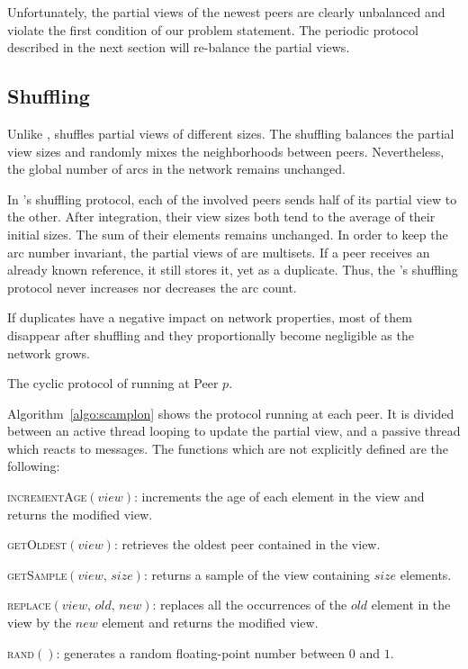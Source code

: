 Unfortunately, the partial views of the newest peers are clearly unbalanced and
violate the first condition of our problem statement. The periodic protocol
described in the next section will re-balance the partial views.

\subsection{Shuffling}
\label{subsec:cyclic}

Unlike \CYCLON, \SPRAY shuffles partial views of different sizes. The
shuffling balances the partial view sizes and randomly mixes the
neighborhoods between peers. Nevertheless, the global number of arcs
in the network remains unchanged.

In \SPRAY's shuffling protocol, each of the involved peers sends half of its
partial view to the other. After integration, their view sizes both tend to the
average of their initial sizes. The sum of their elements remains unchanged. In
order to keep the arc number invariant, the partial views of \SPRAY are
multisets. If a peer receives an already known reference, it still stores it,
yet as a duplicate. Thus, the \SPRAY's shuffling protocol never increases nor
decreases the arc count.

If duplicates have a negative impact on network properties, most of
them disappear after shuffling and they proportionally become
negligible as the network grows.

\begin{algorithm}[h]
  
  \caption{\label{algo:scamplon}The cyclic protocol of \SPRAY running at Peer
    $p$.}
\end{algorithm}

Algorithm~\ref{algo:scamplon} shows the \SPRAY protocol running at
each peer. It is divided between an active thread looping to update
the partial view, and a passive thread which reacts to messages. The
functions which are not explicitly defined are the following:
\begin{compactitem}
\item \textsc{incrementAge}$(view)$: increments the age of each element in the view
  and returns the modified view.
\item \textsc{getOldest}$(view)$: retrieves the oldest peer contained in the view.
\item \textsc{getSample}$(view, \, size)$: returns a sample of the view containing
  $size$ elements.
\item \textsc{replace}$(view,\,old,\,new)$: replaces all the occurrences of the
  $old$ element in the view by the $new$ element and returns the
  modified view.
\item \textsc{rand}$()$: generates a random floating-point number between $0$
  and $1$.
\end{compactitem}

